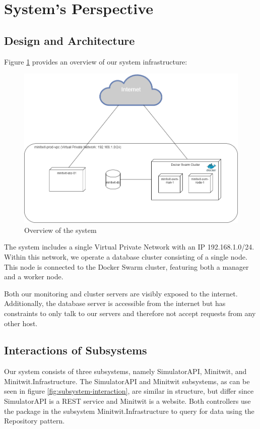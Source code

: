 \section{System's Perspective}

\subsection{Design and Architecture}
Figure \ref{fig:systemoverview} provides an overview of our system infrastructure:
\begin{figure}[H]
    \centering
    \includegraphics[width=0.7\linewidth]{images/system-overview2.png}
    \caption{Overview of the system}
    \label{fig:systemoverview}

\end{figure}
The system includes a single Virtual Private Network with an IP 192.168.1.0/24. Within this network, we operate a database cluster consisting of a single node. This node is connected to the Docker Swarm cluster, featuring both a manager and a worker node.

Both our monitoring and cluster servers are visibly exposed to the internet. Additionally, the database server is accessible from the internet but has constraints to only talk to our servers and therefore not accept requests from any other host.

\subsection{Interactions of Subsystems}
Our system consists of three subsystems, namely SimulatorAPI, Minitwit, and Minitwit.Infrastructure. The SimulatorAPI and Minitwit subsystems, as can be seen in figure \ref{fig:subsystem-interaction}, are similar in structure, but differ since SimulatorAPI is a REST service and Minitwit is a website. Both controllers use the package in the subsystem Minitwit.Infrastructure to query for data using the Repository pattern.


